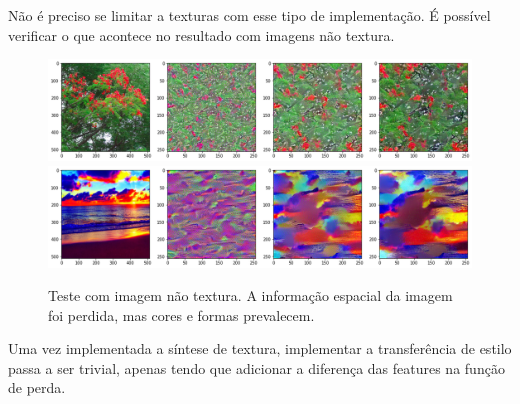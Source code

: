 
\newpage
Não é preciso se limitar a texturas com
esse tipo de implementação. É possível verificar
o que acontece no resultado com imagens não textura.

\begin{figure}[!ht]
	\centering
	\includegraphics[width=\linewidth]{files/assets/results/result7.png}
	\includegraphics[width=\linewidth]{files/assets/results/result8.png}
	\caption{Teste com imagem não textura. A informação espacial da imagem foi perdida,
	mas cores e formas prevalecem.}
	\label{img:preview}
\end{figure}

\newpage
Uma vez implementada a síntese de textura, implementar
a transferência de estilo passa a ser trivial,
apenas tendo que adicionar a diferença das features
na função de perda.


